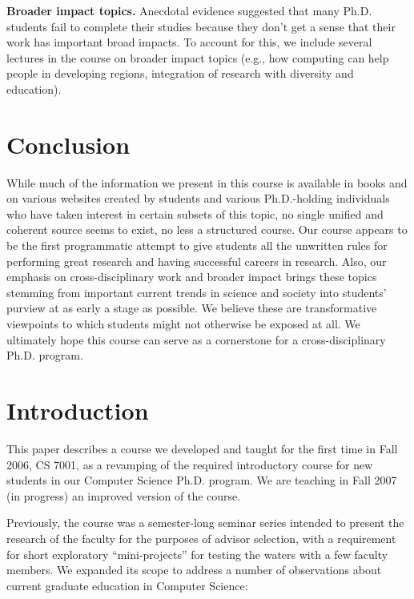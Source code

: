 \vspace*{0.1in}
\noindent
{\bf Broader impact topics.}  Anecdotal evidence suggested that many
Ph.D. students fail to complete their studies because they don't get a
sense that their work has important broad impacts.  To account for this,
we include several lectures in the course on broader impact topics
(e.g., how computing can help people in developing regions, integration
of research with diversity and education).  
\section{Conclusion}\label{sec:conclusion}

While much of the information we present in this course is available in
books and on various websites created by students and various
Ph.D.-holding individuals who have taken interest in certain subsets of
this topic, no single unified and coherent source seems to exist, no
less a structured course.  Our course appears to be the first
programmatic attempt to give students all the unwritten rules for
performing great research and having successful careers in research.
Also, our emphasis on cross-disciplinary work and broader impact brings
these topics stemming from important current trends in science and
society into students' purview at as early a stage as possible.  We
believe these are transformative viewpoints to which students might not
otherwise be exposed at all.  We ultimately hope this course can
serve as a cornerstone for a cross-disciplinary Ph.D. program.

\section{Introduction}

This paper describes a course we developed and taught for the first
time in Fall 2006, CS 7001, as a revamping of the required
introductory course for new students in our Computer Science Ph.D.
program.  We are teaching in Fall 2007 (in progress)
an improved version of the course.

Previously, the course was a semester-long seminar series
intended to present the research of the faculty for
the purposes of advisor selection, with a requirement for short
exploratory ``mini-projects'' for testing the waters with a few faculty
members.  We expanded its scope to
address a number of observations about current graduate education in
Computer Science:

